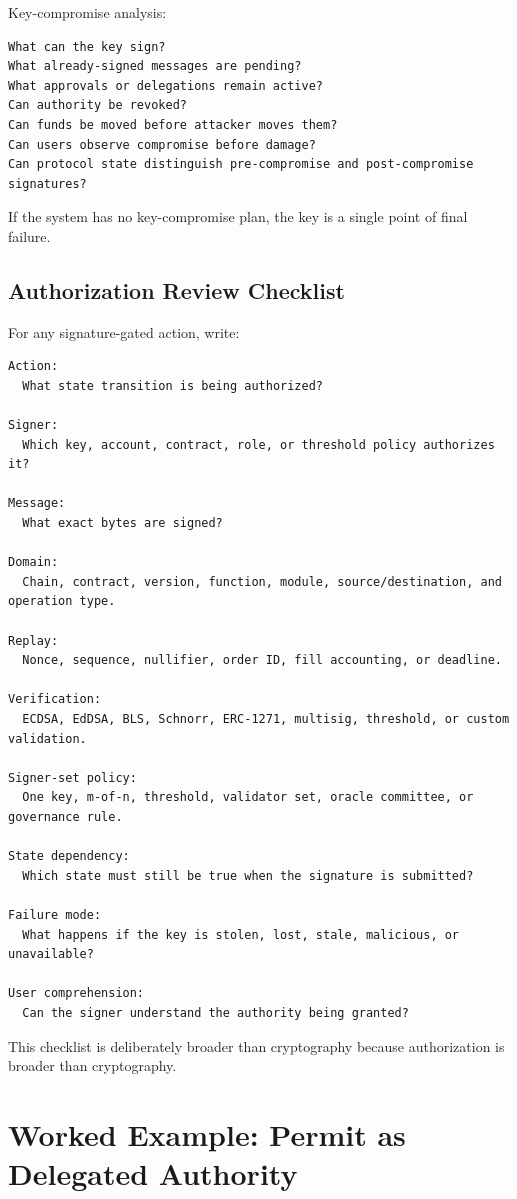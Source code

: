 Key-compromise analysis:

\begin{lstlisting}
What can the key sign?
What already-signed messages are pending?
What approvals or delegations remain active?
Can authority be revoked?
Can funds be moved before attacker moves them?
Can users observe compromise before damage?
Can protocol state distinguish pre-compromise and post-compromise signatures?
\end{lstlisting}

If the system has no key-compromise plan, the key is a single point of
final failure.

\subsection{Authorization Review Checklist}

For any signature-gated action, write:

\begin{lstlisting}
Action:
  What state transition is being authorized?

Signer:
  Which key, account, contract, role, or threshold policy authorizes it?

Message:
  What exact bytes are signed?

Domain:
  Chain, contract, version, function, module, source/destination, and operation type.

Replay:
  Nonce, sequence, nullifier, order ID, fill accounting, or deadline.

Verification:
  ECDSA, EdDSA, BLS, Schnorr, ERC-1271, multisig, threshold, or custom validation.

Signer-set policy:
  One key, m-of-n, threshold, validator set, oracle committee, or governance rule.

State dependency:
  Which state must still be true when the signature is submitted?

Failure mode:
  What happens if the key is stolen, lost, stale, malicious, or unavailable?

User comprehension:
  Can the signer understand the authority being granted?
\end{lstlisting}

This checklist is deliberately broader than cryptography because
authorization is broader than cryptography.

\section{Worked Example: Permit as Delegated Authority}

